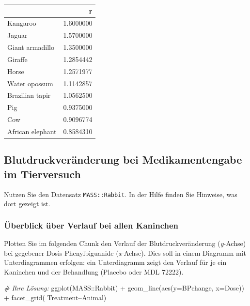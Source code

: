 \documentclass[
]{article}
\newenvironment{Shaded}{\begin{snugshade}}{\end{snugshade}}
\newcommand{\AttributeTok}[1]{\textcolor[rgb]{0.77,0.63,0.00}{#1}}
\newcommand{\CommentTok}[1]{\textcolor[rgb]{0.56,0.35,0.01}{\textit{#1}}}
\newcommand{\FunctionTok}[1]{\textcolor[rgb]{0.00,0.00,0.00}{#1}}
\newcommand{\NormalTok}[1]{#1}
\newcommand{\SpecialCharTok}[1]{\textcolor[rgb]{0.00,0.00,0.00}{#1}}
\begin{document}
\begin{longtable}[]{@{}lr@{}}
\toprule()
& r \\
\midrule()
\endhead
Kangaroo & 1.6000000 \\
Jaguar & 1.5700000 \\
Giant armadillo & 1.3500000 \\
Giraffe & 1.2854442 \\
Horse & 1.2571977 \\
Water opossum & 1.1142857 \\
Brazilian tapir & 1.0562500 \\
Pig & 0.9375000 \\
Cow & 0.9096774 \\
African elephant & 0.8584310 \\
\bottomrule()
\end{longtable}

\hypertarget{blutdruckveruxe4nderung-bei-medikamentengabe-im-tierversuch}{%
\subsection{Blutdruckveränderung bei Medikamentengabe im
Tierversuch}\label{blutdruckveruxe4nderung-bei-medikamentengabe-im-tierversuch}}

Nutzen Sie den Datensatz \texttt{MASS::Rabbit}. In der Hilfe finden Sie
Hinweise, was dort gezeigt ist.

\hypertarget{uxfcberblick-uxfcber-verlauf-bei-allen-kaninchen}{%
\subsubsection{Überblick über Verlauf bei allen
Kaninchen}\label{uxfcberblick-uxfcber-verlauf-bei-allen-kaninchen}}

Plotten Sie im folgenden Chunk den Verlauf der Blutdruckveränderung
(\emph{y}-Achse) bei gegebener Dosis Phenylbiguanide (\emph{x}-Achse).
Dies soll in einem Diagramm mit Unterdiagrammen erfolgen: ein
Unterdiagramm zeigt den Verlauf für je ein Kaninchen und der Behandlung
(Placebo oder MDL 72222).

\begin{Shaded}
\begin{Highlighting}[]
\CommentTok{\# Ihre Lösung:}
\FunctionTok{ggplot}\NormalTok{(MASS}\SpecialCharTok{::}\NormalTok{Rabbit) }\SpecialCharTok{+} \FunctionTok{geom\_line}\NormalTok{(}\FunctionTok{aes}\NormalTok{(}\AttributeTok{y=}\NormalTok{BPchange, }\AttributeTok{x=}\NormalTok{Dose)) }\SpecialCharTok{+} \FunctionTok{facet\_grid}\NormalTok{( Treatment}\SpecialCharTok{\textasciitilde{}}\NormalTok{Animal)}
\end{Highlighting}
\end{Shaded}
\end{document}
